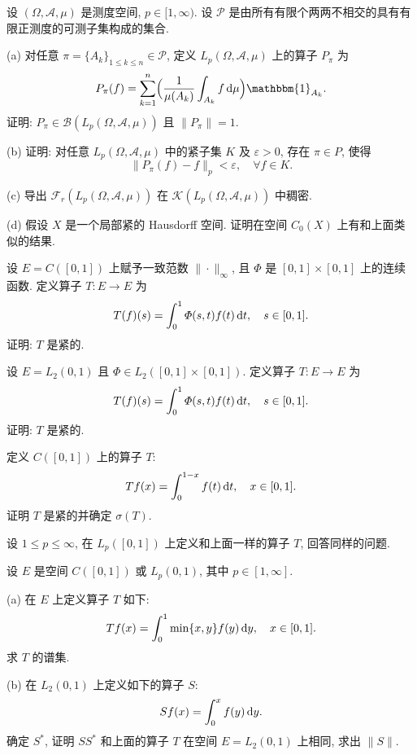\begin{exercise}
    设 $(\varOmega,\mathcal{A},\mu)$ 是测度空间, $p\in [1,\infty)$.
    设 $\mathcal{P}$ 是由所有有限个两两不相交的具有有限正测度的可测子集构成的集合.

    (a) 对任意 $\pi=\{A_k\}_{1\leq k\leq n}\in\mathcal{P}$, 定义 $L_p(\varOmega,\mathcal{A},\mu)$ 上的算子 $P_{\pi}$ 为
    \[P_{\pi}(f)=\sum_{k=1}^n \Bigl(\frac{1}{\mu(A_k)}\int_{A_k}f\diff\mu\Bigr)\mathbbm{1}_{A_k}.\]
    证明: $P_{\pi}\in\mathcal{B}(L_p(\varOmega,\mathcal{A},\mu))$ 且 $\|P_{\pi}\|=1$.

    (b) 证明: 对任意 $L_p(\varOmega,\mathcal{A},\mu)$ 中的紧子集 $K$ 及 $\varepsilon>0$, 存在 $\pi\in P$, 使得
    \[\|P_{\pi}(f)-f\|_p<\varepsilon,\quad\forall f\in K.\]

    (c) 导出 $\mathcal{F}_r(L_p(\varOmega,\mathcal{A},\mu))$ 在 $\mathcal{K}(L_p(\varOmega,\mathcal{A},\mu))$ 中稠密.

    (d) 假设 $X$ 是一个局部紧的 Hausdorff 空间. 证明在空间 $C_0(X)$ 上有和上面类似的结果.
\end{exercise}



\begin{exercise}
    设 $E=C([0,1])$ 上赋予一致范数 $\|\cdot\|_{\infty}$, 且 $\varPhi$ 是 $[0,1]\times [0,1]$
    上的连续函数. 定义算子 $T:E\to E$ 为
    \[T(f)(s)=\int_0^1 \varPhi(s,t)f(t)\mathop{}\!\mathrm{d} t,\quad s\in [0,1].\]
    证明: $T$ 是紧的.
\end{exercise}



\begin{exercise}
    设 $E=L_2(0,1)$ 且 $\varPhi\in L_2([0,1]\times [0,1])$. 定义算子 $T:E\to E$ 为
    \[T(f)(s)=\int_0^1 \varPhi(s,t)f(t)\mathop{}\!\mathrm{d} t,\quad s\in [0,1].\]
    证明: $T$ 是紧的.
\end{exercise}



\begin{exercise}
    定义 $C([0,1])$ 上的算子 $T$:
    \[Tf(x)=\int_0^{1-x} f(t)\mathop{}\!\mathrm{d} t,\quad x\in [0,1].\]
    证明 $T$ 是紧的并确定 $\sigma(T)$.

    设 $1\leq p\leq\infty$, 在 $L_p([0,1])$ 上定义和上面一样的算子 $T$, 回答同样的问题.
\end{exercise}



\begin{exercise}
    设 $E$ 是空间 $C([0,1])$ 或 $L_p(0,1)$, 其中 $p\in [1,\infty]$.

    (a) 在 $E$ 上定义算子 $T$ 如下:
    \[Tf(x)=\int_0^1 \min\{x,y\}f(y)\mathop{}\!\mathrm{d} y,\quad x\in [0,1].\]
    求 $T$ 的谱集.

    (b) 在 $L_2(0,1)$ 上定义如下的算子 $S$:
    \[Sf(x)=\int_0^x f(y)\mathop{}\!\mathrm{d} y.\]
    确定 $S^*$, 证明 $SS^*$ 和上面的算子 $T$ 在空间 $E=L_2(0,1)$ 上相同, 求出 $\|S\|$.
\end{exercise}




